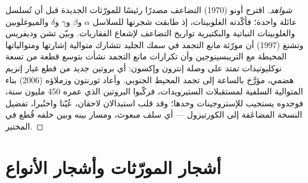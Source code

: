 \begin{proof}[شواهد]
اقترح أونو (1970) التضاعف مصدرًا رئيسًا للمورّثات الجديدة
قبل أن تُسلسل عائلة واحدة؛ فأكّدته الغلوبينات، إذ طابقت
شجرتها للسلاسل $\alpha$ و$\beta$ و$\gamma$ و$\delta$ والميوغلوبين
والغلوبينات النباتية والبكتيرية تواريخ التضاعف لإشعاع
الفقاريات. وبيّن تشن وديفريس وتشنغ (1997) أن مورّثة مانع
التجمد في سمك الجليد تتشارك متوالية إشارتها ومتوالياتها
المحيطة مع التريبسينوجين وأن تكرارات مانع التجمد نشأت بتوسع
قطعة من تسعة نوكليوتيدات تمتد على وصلة إنترون وإكسون: أي
بروتين جديد من قطع غيار إنزيم هضمي، مؤرَّخ بالساعة إلى تجمد
المحيط الجنوبي. وأعاد ثورنتون وزملاؤه (2006) بناء المتوالية
السلفية لمستقبلات الستيرويدات، فركّبوا البروتين الذي عمره 450
مليون سنة، فوجدوه يستجيب للإستروجينات وحدها؛ وقد قلب
استبدالان لاحقان، عُيّنا واختُبرا، تفضيل النسخة المضاعَفة إلى
الكورتيزول --- أي سلف مبعوث، ومسار بينه وبين خلفه قُطع في
المختبر.
\end{proof}

\section{أشجار المورّثات وأشجار الأنواع}

